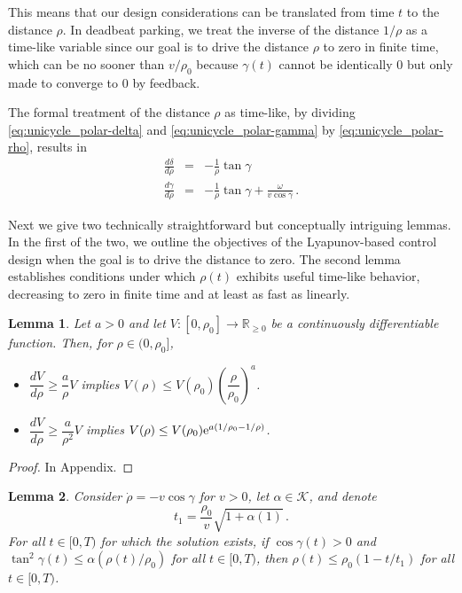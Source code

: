 \documentclass[letterpaper, 10 pt, conference]{ieeeconf}  %
\newtheorem{lemma}{Lemma}
\begin{document}
This means that our design considerations can be translated from time $t$ to the distance $\rho$. In deadbeat parking, we treat the inverse of the distance $1/ \rho$ as a time-like variable since our goal is to drive the distance $\rho$ to zero in finite time, which can be no sooner than $v/\rho_0$ because $\gamma(t)$ cannot be identically 0 but only made to converge to 0 by feedback.

The formal treatment of the distance $\rho$ as time-like, by dividing \eqref{eq:unicycle_polar-delta} and \eqref{eq:unicycle_polar-gamma} by \eqref{eq:unicycle_polar-rho}, results in
\begin{subequations}
\label{eq:unicycle_polardrho}
\begin{eqnarray}
\label{eq:unicycle_polar-deltadrho}
\frac{d\delta}{d\rho} &=& - \frac{1}{\rho}\tan\gamma \\
\label{eq:unicycle_polar-gammadrho}
\frac{d\gamma}{d\rho} &=&- \frac{1}{\rho}\tan\gamma +\frac{\omega}{v\cos\gamma}  \,.
\end{eqnarray} 
\end{subequations}

Next we give two technically straightforward but conceptually intriguing lemmas. In the first of the two, we outline the objectives of the Lyapunov-based control design when the goal is to drive the distance to zero. The second lemma establishes conditions under which $\rho(t)$ exhibits useful time-like behavior, decreasing to zero in finite time and at least as fast as linearly. 

\begin{lemma}
\label{lem1}
Let $a>0$ and let $V:[0,\rho_0]\to\mathbb{R}_{\ge 0}$ be a continuously differentiable function. Then, for $\rho\in(0,\rho_0]$,
\begin{itemize}
\item $\dfrac{dV}{d\rho} \geq \dfrac{a}{\rho}V$ implies $V(\rho)\leq V(\rho_0) \left(\dfrac{\rho}{\rho_0}\right)^a$. 
\item $\dfrac{dV}{d\rho} \geq \dfrac{a}{\rho^2}V$ implies $V(\rho)\leq V(\rho_0) {\rm e}^{a\left(1/{\rho_0}-{1}/{\rho}\right)}$. 
\end{itemize}
\end{lemma}

\begin{proof}
In Appendix.
\end{proof}

\begin{lemma}
\label{lem2}
Consider $\dot\rho = - v\cos\gamma$ for $v>0$, let $\alpha\in\mathcal{K}$, and denote
\begin{equation}
t_1 = \frac{\rho_0}{v}\sqrt{1+\alpha(1)}\,.
\end{equation}
For all $t\in [0,T)$  for which the solution exists, if $\cos\gamma(t)>0$ and $\tan^2\gamma(t)\leq \alpha(\rho(t)/\rho_0)$ for all $t\in[0,T)$, then $\rho(t)\leq \rho_0(1-t/t_1)$ for all $t\in[0,T)$.
\end{lemma}
\end{document}
